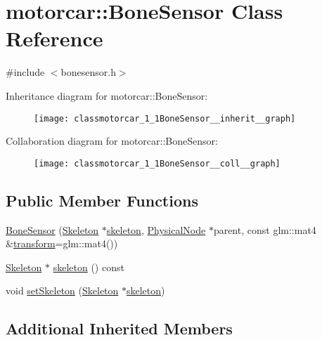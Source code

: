 \hypertarget{classmotorcar_1_1BoneSensor}{\section{motorcar\-:\-:Bone\-Sensor Class Reference}
\label{classmotorcar_1_1BoneSensor}
}


{\ttfamily \#include $<$bonesensor.\-h$>$}



Inheritance diagram for motorcar\-:\-:Bone\-Sensor\-:
\nopagebreak
\begin{figure}[H]
\begin{center}
\leavevmode
\texttt{[image: classmotorcar\_1\_1BoneSensor\_\_inherit\_\_graph]}
\end{center}
\end{figure}


Collaboration diagram for motorcar\-:\-:Bone\-Sensor\-:
\nopagebreak
\begin{figure}[H]
\begin{center}
\leavevmode
\texttt{[image: classmotorcar\_1\_1BoneSensor\_\_coll\_\_graph]}
\end{center}
\end{figure}
\subsection*{Public Member Functions}
\begin{DoxyCompactItemize}
\item 
\hyperlink{classmotorcar_1_1BoneSensor_a98633120d660896393934a6df827aa69}{Bone\-Sensor} (\hyperlink{classmotorcar_1_1Skeleton}{Skeleton} $\ast$\hyperlink{classmotorcar_1_1BoneSensor_a71f19e3ae5fac133a9f359c5ba4cef00}{skeleton}, \hyperlink{classmotorcar_1_1PhysicalNode}{Physical\-Node} $\ast$parent, const glm\-::mat4 \&\hyperlink{classmotorcar_1_1SceneGraphNode_ad96e79fdd739ac8223a3128003be391a}{transform}=glm\-::mat4())
\item 
\hyperlink{classmotorcar_1_1Skeleton}{Skeleton} $\ast$ \hyperlink{classmotorcar_1_1BoneSensor_a71f19e3ae5fac133a9f359c5ba4cef00}{skeleton} () const 
\item 
void \hyperlink{classmotorcar_1_1BoneSensor_ae84da9d4a2116e603222b72e43f750fe}{set\-Skeleton} (\hyperlink{classmotorcar_1_1Skeleton}{Skeleton} $\ast$\hyperlink{classmotorcar_1_1BoneSensor_a71f19e3ae5fac133a9f359c5ba4cef00}{skeleton})
\end{DoxyCompactItemize}
\subsection*{Additional Inherited Members}


